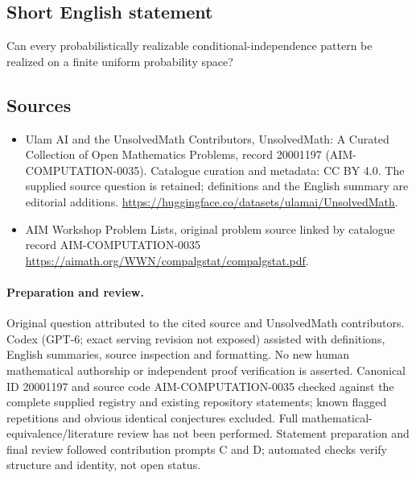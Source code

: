 \documentclass[11pt]{article}
\begin{document}
\subsection{Short English statement}
Can every probabilistically realizable conditional-independence pattern be realized on a finite uniform probability space?
\subsection{Sources}
\begin{itemize}
\item[\hypertarget{source:20001197:1}{S1}] Ulam AI and the UnsolvedMath Contributors, UnsolvedMath: A Curated Collection of Open Mathematics Problems, record 20001197 (AIM-COMPUTATION-0035). Catalogue curation and metadata: CC BY 4.0. The supplied source question is retained; definitions and the English summary are editorial additions.
\url{https://huggingface.co/datasets/ulamai/UnsolvedMath}.
\item[\hypertarget{source:20001197:2}{S2}] AIM Workshop Problem Lists, original problem source linked by catalogue record AIM-COMPUTATION-0035
\url{https://aimath.org/WWN/compalgstat/compalgstat.pdf}.
\end{itemize}
\paragraph{Preparation and review.}
Original question attributed to the cited source and UnsolvedMath contributors. Codex (GPT-6; exact serving revision not exposed) assisted with definitions, English summaries, source inspection and formatting. No new human mathematical authorship or independent proof verification is asserted. Canonical ID 20001197 and source code AIM-COMPUTATION-0035 checked against the complete supplied registry and existing repository statements; known flagged repetitions and obvious identical conjectures excluded. Full mathematical-equivalence/literature review has not been performed. Statement preparation and final review followed contribution prompts C and D; automated checks verify structure and identity, not open status.
\label{end:20001197}
\end{document}
